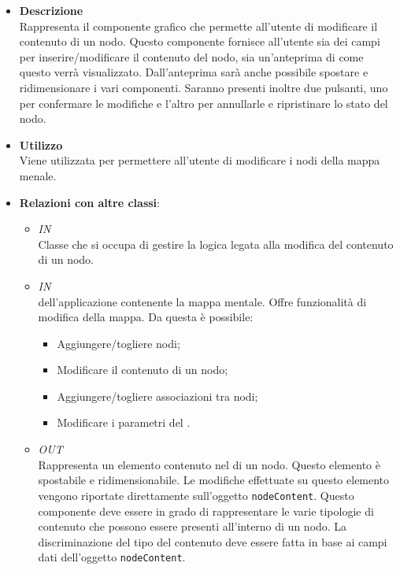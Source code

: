 \begin{itemize}
\item \textbf{Descrizione}\\
Rappresenta il componente grafico che permette all’utente di modificare il contenuto di un nodo. Questo componente fornisce all’utente sia dei campi per inserire/modificare il contenuto del nodo, sia un’anteprima di come questo verrà visualizzato. Dall’anteprima sarà anche possibile spostare e ridimensionare i vari componenti.
Saranno presenti inoltre due pulsanti, uno per confermare le modifiche e l’altro per annullarle e ripristinare lo stato del nodo.
\item \textbf{Utilizzo}\\
Viene utilizzata per permettere all’utente di modificare i nodi della mappa menale.
\item \textbf{Relazioni con altre classi}:
\begin{itemize}
\item \textit{IN} \hyperref[\nogloxy{Premi::Front-End::Controllers::NodeContentsEditorController}]{}\\
Classe che si occupa di gestire la logica legata alla modifica del contenuto di un nodo.
\item \textit{IN} \hyperref[\nogloxy{Premi::Front-End::Views::MindmapEditorView}]{}\\
 dell’applicazione contenente la mappa mentale. Offre funzionalità di modifica della mappa.
Da questa  è possibile:
\begin{itemize}
\item Aggiungere/togliere nodi;
\item Modificare il contenuto di un nodo;
\item Aggiungere/togliere associazioni tra nodi;
\item Modificare i parametri del .
\end{itemize}
\item \textit{OUT} \hyperref[\nogloxy{Premi::Front-End::Directives::premiEditableNodeContent}]{}\\
Rappresenta un elemento contenuto nel  di un nodo. Questo elemento è spostabile e ridimensionabile. Le modifiche effettuate su questo elemento vengono riportate direttamente sull’oggetto \texttt{nodeContent}.
Questo componente deve essere in grado di rappresentare le varie tipologie di contenuto che possono essere presenti all’interno di un nodo. La discriminazione del tipo del contenuto deve essere fatta in base ai campi dati dell’oggetto \texttt{nodeContent}.

\end{itemize}
\end{itemize}

